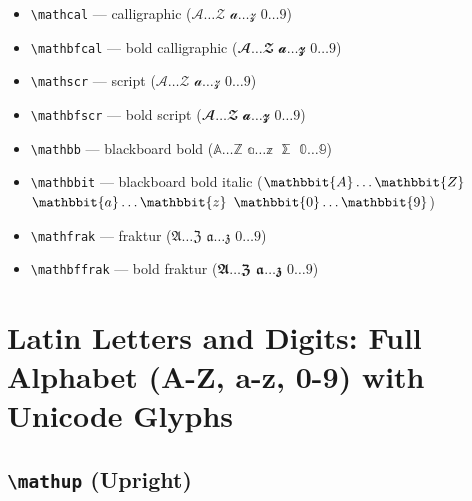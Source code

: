 \documentclass[12pt,a4paper]{article}
\begin{document}
\begin{itemize}
    \item \texttt{\textbackslash{}mathcal} --- calligraphic ($\mathcal{A} \ldots \mathcal{Z}$ $\mathcal{a} \ldots \mathcal{z}$ $\mathcal{0} \ldots \mathcal{9}$)
    \item \texttt{\textbackslash{}mathbfcal} --- bold calligraphic ($\mathbfcal{A} \ldots \mathbfcal{Z}$ $\mathbfcal{a} \ldots \mathbfcal{z}$ $\mathbfcal{0} \ldots \mathbfcal{9}$)
    \item \texttt{\textbackslash{}mathscr} --- script ($\mathscr{A} \ldots \mathscr{Z}$ $\mathscr{a} \ldots \mathscr{z}$ $\mathscr{0} \ldots \mathscr{9}$)
    \item \texttt{\textbackslash{}mathbfscr} --- bold script ($\mathbfscr{A} \ldots \mathbfscr{Z}$ $\mathbfscr{a} \ldots \mathbfscr{z}$ $\mathbfscr{0} \ldots \mathbfscr{9}$)
    \item \texttt{\textbackslash{}mathbb} --- blackboard bold ($\mathbb{A} \ldots \mathbb{Z}$ $\mathbb{a} \ldots \mathbb{z}$ $\mathbb{\sum}$ $\mathbb{0} \ldots \mathbb{9}$)
    \item \texttt{\textbackslash{}mathbbit} --- blackboard bold italic ($\mathbbit{A} \ldots \mathbbit{Z}$ $\mathbbit{a} \ldots \mathbbit{z}$ $\mathbbit{0} \ldots \mathbbit{9}$)
    \item \texttt{\textbackslash{}mathfrak} --- fraktur ($\mathfrak{A} \ldots \mathfrak{Z}$ $\mathfrak{a} \ldots \mathfrak{z}$ $\mathfrak{0} \ldots \mathfrak{9}$)
    \item \texttt{\textbackslash{}mathbffrak} --- bold fraktur ($\mathbffrak{A} \ldots \mathbffrak{Z}$ $\mathbffrak{a} \ldots \mathbffrak{z}$ $\mathbffrak{0} \ldots \mathbffrak{9}$)
\end{itemize}

\newpage

\section*{Latin Letters and Digits: Full Alphabet (A-Z, a-z, 0-9) with Unicode Glyphs}

\subsection*{\texttt{\textbackslash{}mathup} (Upright)}
\end{document}
